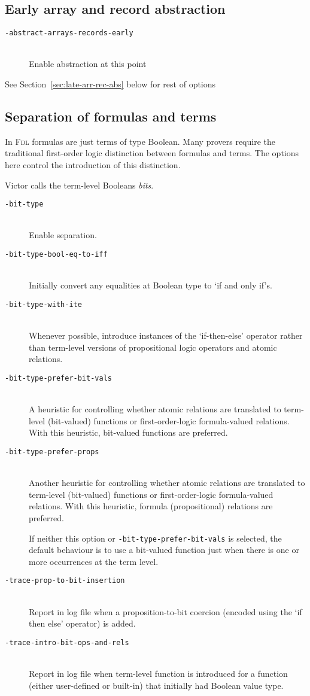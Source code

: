 \documentclass[12pt,fleqn]{article}
\newcommand{\fdl}{\textsc{Fdl}}
\newcommand{\optionb}[1]{\item[\texttt{-{#1}}]\ \\}
\begin{document}
\subsection{Early array and record abstraction}

\begin{description}
\optionb{abstract-arrays-records-early} Enable abstraction at this point
\end{description}
See Section~\ref{sec:late-arr-rec-abs} below for rest of options

\subsection{Separation of formulas and terms}

In \fdl{} formulas are just terms of type Boolean.   Many provers require
the traditional first-order logic distinction between formulas and terms.
%
The options here control the introduction of this distinction.

Victor calls the term-level Booleans \emph{bits}.


\begin{description}
\optionb{bit-type} Enable separation.  
\optionb{bit-type-bool-eq-to-iff}
  Initially convert any equalities at Boolean type to `if and only if's.

\optionb{bit-type-with-ite} Whenever possible, introduce instances
  of the `if-then-else' operator rather than term-level versions of
  propositional logic operators and atomic relations.
  
\optionb{bit-type-prefer-bit-vals}
  A heuristic for controlling whether atomic relations are translated
  to term-level (bit-valued) functions or first-order-logic formula-valued
  relations.
  With this heuristic, bit-valued functions are preferred.

\optionb{bit-type-prefer-props}
  Another heuristic for controlling whether atomic relations are translated
  to term-level (bit-valued) functions or first-order-logic formula-valued
  relations.
  With this heuristic, formula (propositional) relations are preferred.

  If neither this option or \texttt{-bit-type-prefer-bit-vals} is selected,
  the default behaviour is to use a bit-valued function just when 
  there is one or more occurrences at the term level.

\optionb{trace-prop-to-bit-insertion}
  Report in log file when a proposition-to-bit coercion (encoded using the
  `if then else' operator) is added.
 
\optionb{trace-intro-bit-ops-and-rels}
  Report in log file when term-level function is introduced for a function
  (either user-defined or built-in) that initially had Boolean value type.

\end{description}
\end{document}
